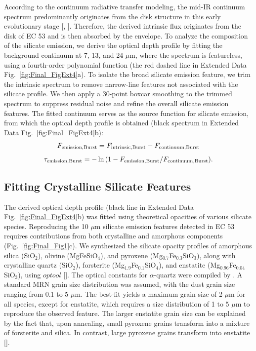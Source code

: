 \documentclass[pdflatex,sn-mathphys-num]{sn-jnl}
\theoremstyle{thmstyleone}
\theoremstyle{thmstyletwo}
\theoremstyle{thmstylethree}
\begin{document}
\begin{bibunit}
According to the continuum radiative transfer modeling, the mid-IR continuum spectrum predominantly originates from the disk structure in this early evolutionary stage [, ]\nocite{Robitaille2006}.
Therefore, the derived intrinsic flux originates from the disk of EC 53 and is then absorbed by the envelope.
To analyze the composition of the silicate emission, we derive the optical depth profile by fitting the background continuum at 7, 13, and 24 $\mu$m, where the spectrum is featureless, using a fourth-order polynomial function (the red dashed line in Extended Data Fig.~\ref{fig:Final_FigExt4}a).
To isolate the broad silicate emission feature, we trim the intrinsic spectrum to remove narrow-line features not associated with the silicate profile. We then apply a 30-point boxcar smoothing to the trimmed spectrum to suppress residual noise and refine the overall silicate emission features.
The fitted continuum serves as the source function for silicate emission, from which the optical depth profile is obtained (black spectrum in Extended Data Fig.~\ref{fig:Final_FigExt4}b):
\begin{equation*}
F_{\rm emission, Burst}=F_{\rm intrinsic, Burst}-F_{\rm continuum, Burst}
\end{equation*}
\begin{equation*}
\tau_{\rm emission, Burst}=-\ln{(1-F_{\rm emission, Burst}/F_{\rm continuum, Burst})}.
\end{equation*}

\subsection{Fitting Crystalline Silicate Features}

The derived optical depth profile (black line in Extended Data Fig.~\ref{fig:Final_FigExt4}b) was fitted using theoretical opacities of various silicate species. Reproducing the 10 $\mu$m silicate emission features detected in EC 53 requires contributions from both crystalline and amorphous components (Fig.~\ref{fig:Final_Fig1}c). We synthesized the silicate opacity profiles of amorphous silica (SiO$_{2}$), olivine (MgFeSiO$_4$), and pyroxene (Mg$_{0.7}$Fe$_{0.3}$SiO$_3$), along with crystalline quartz (SiO$_{2}$), forsterite (Mg$_{1.9}$Fe$_{0.1}$SiO$_4$), and enstatite (Mg$_{0.96}$Fe$_{0.04}$SiO$_3$), using $optool$ []. The optical constants for $\alpha$-quartz were compiled by \citep{Zeidler2013}. A standard MRN grain size distribution \citep{MRN1977} was assumed, with the dust grain size ranging from 0.1 to 5 $\mu$m. The best-fit yields a maximum grain size of 2 $\mu$m for all species, except for enstatite, which requires a size distribution of 1 to 5 $\mu$m to reproduce the observed feature. The larger enstatite grain size can be explained by the fact that, upon annealing, small pyroxene grains transform into a mixture of forsterite and silica. In contrast, large pyroxene grains transform into enstatite [].


\end{bibunit}
\end{document}
